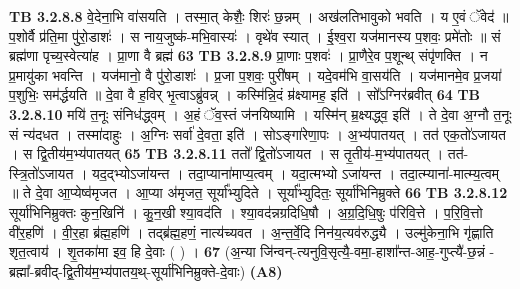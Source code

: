 \documentclass[17pt]{extarticle}
\begin{document}
{{{{{{{{{{{{{{{{{{{                                \textbf{ TB 3.2.8.8} \newline
                  वे॒देना॒भि वा॑सयति । तस्मा॒त् केशैः॒ शिरः॑ छ॒न्नम् । अख॑लतिभावुको भवति । य ए॒वं ॅवेद॑ ॥ प॒शोर्वै प्र॑ति॒मा पु॑रो॒डाशः॑ । स नाय॒जुष्क॑-मभि॒वास्यः॑ । वृथे॑व स्यात् । ई॒श्व॒रा यज॑मानस्य प॒शवः॒ प्रमे॑तोः ॥ सं ब्रह्म॑णा पृच्य॒स्वेत्या॑ह । प्रा॒णा वै ब्रह्म॑ \textbf{ 63} \newline
                  \newline
                                \textbf{ TB 3.2.8.9} \newline
                  प्रा॒णाः प॒शवः॑ । प्रा॒णैरे॒व प॒शून्थ् संपृ॑णक्ति । न प्र॒मायु॑का भवन्ति । यज॑मानो॒ वै पु॑रो॒डाशः॑ । प्र॒जा प॒शवः॒ पुरी॑षम् । यदे॒वम॑भि वा॒सय॑ति । यज॑मानमे॒व प्र॒जया॑ प॒शुभिः॒ सम॑र्द्धयति ॥ दे॒वा वै ह॒विर् भृ॒त्वाऽब्रु॑वन्न् । कस्मि॑न्नि॒दं म्र॑क्ष्यामह॒ इति॑ । सो᳚ऽग्निर॑ब्रवीत् \textbf{ 64} \newline
                  \newline
                                \textbf{ TB 3.2.8.10} \newline
                  मयि॑ त॒नूः संनिध॑द्ध्वम् । अ॒हं ॅव॒स्तं ज॑नयिष्यामि । यस्मि॑न् म्र॒क्ष्यद्ध्व॒ इति॑ । ते दे॒वा अ॒ग्नौ त॒नूः सं न्य॑दधत । तस्मा॑दाहुः । अ॒ग्निः सर्वा॑ दे॒वता॒ इति॑ । सोऽङ्गा॑रेणा॒पः । अ॒भ्य॑पातयत् । तत॑ एक॒तो॑ऽजायत । स द्वि॒तीय॑म॒भ्य॑पातयत् \textbf{ 65} \newline
                  \newline
                                \textbf{ TB 3.2.8.11} \newline
                  ततो᳚ द्वि॒तो॑ऽजायत । स तृ॒तीय॑-म॒भ्य॑पातयत् । तत॑-स्त्रि॒तो॑ऽजायत । यद॒द्भ्योऽजा॑यन्त । तदा॒प्याना॑माप्य॒त्वम् । यदा॒त्मभ्यो ऽजा॑यन्त । तदा॒त्म्याना॑-मात्म्य॒त्वम् ॥ ते दे॒वा आ॒प्येष्व॑मृजत । आ॒प्या अ॑मृजत॒ सूर्या᳚भ्युदिते । सूर्या᳚भ्युदितः॒ सूर्या॑भिनिम्रुक्ते \textbf{ 66} \newline
                  \newline
                                \textbf{ TB 3.2.8.12} \newline
                  सूर्या॑भिनिम्रुक्तः कुन॒खिनि॑ । कु॒न॒खी श्या॒वद॑ति । श्या॒वद॑न्नग्रदिधि॒षौ । अ॒ग्र॒दि॒धि॒षुः प॑रिवि॒त्ते । प॒रि॒वि॒त्तो वी॑र॒हणि॑ । वी॒र॒हा ब्र॑ह्म॒हणि॑ । तद्ब्र॑ह्म॒हणं॒ नात्य॑च्यवत । अ॒न्त॒र्वे॒दि निन॑य॒त्यव॑रुद्ध्यै । उल्मु॑केना॒भि गृ॑ह्णाति शृत॒त्वाय॑ । शृ॒तका॑मा इव॒ हि दे॒वाः ( ) । \textbf{ 67} \newline
                  \newline
                                    (अ॒न्या जि॑न्वन्-त्यनुवि॒सृत्यै॒-वमा॒-हाशा᳚न्त-आह॒-गुप्त्यै॑-छ॒न्नं - ब्रह्मा᳚-ब्रवीद्-द्वि॒तीय॑म॒भ्य॑पातय॒थ्-सूर्या॑भिनिम्रुक्ते-दे॒वाः) \textbf{(A8)} \newline \newline
}}}}}}}}}}}}}}}}}}}
\end{document}

